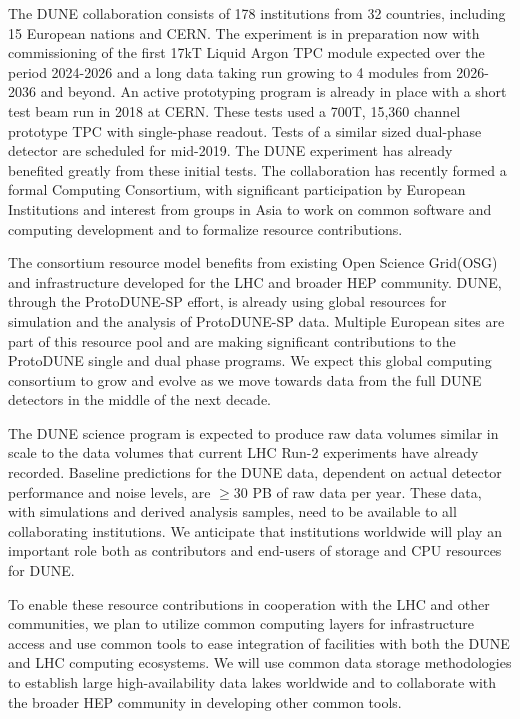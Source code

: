 The DUNE  collaboration consists of 178 institutions from 32 countries, including 15 European nations and CERN. The experiment is in preparation now with commissioning of the first 17kT Liquid Argon TPC  module expected over the period 2024-2026 and a long data taking run growing to 4 modules from 2026-2036 and beyond.  An active prototyping program is already in place with a short test beam run in 2018 at CERN.  These tests used  a 700T, 15,360 channel prototype TPC with single-phase readout.  Tests of a similar sized dual-phase detector are scheduled for mid-2019.   The DUNE experiment has already  benefited greatly from these initial tests.  The collaboration has recently formed a formal Computing Consortium, with significant participation by European Institutions and interest from groups in Asia to work on common software and computing development and to formalize resource contributions.

The consortium resource model benefits from existing Open Science Grid\dshort(OSG)  and  infrastructure developed for the LHC and broader HEP community.  DUNE, through  the ProtoDUNE-SP effort, is already using global resources for simulation and the analysis of ProtoDUNE-SP data.  Multiple European sites are part of this resource pool and are making significant contributions to the ProtoDUNE single and dual phase programs.  We expect this global computing consortium to grow and evolve as we move towards data from the full DUNE detectors in the middle of the next decade.

The DUNE science program is expected to produce raw data volumes similar in scale to the data volumes that current LHC Run-2 experiments have already recorded.  Baseline predictions for the DUNE data, dependent on actual detector performance and noise levels, are $\ge 30$ PB of raw data per year.  These data, with simulations and derived analysis samples, need to be available to all collaborating institutions.  We anticipate that institutions worldwide will play an important role both as contributors and end-users of storage and CPU resources for DUNE.

To enable these resource contributions in cooperation with the LHC and other communities, we plan to utilize common computing layers for infrastructure access and use common tools to ease integration of facilities with both the DUNE and LHC computing ecosystems.  We will use common data storage methodologies to establish large high-availability data lakes worldwide  and to collaborate with the broader HEP community in developing other common tools.


